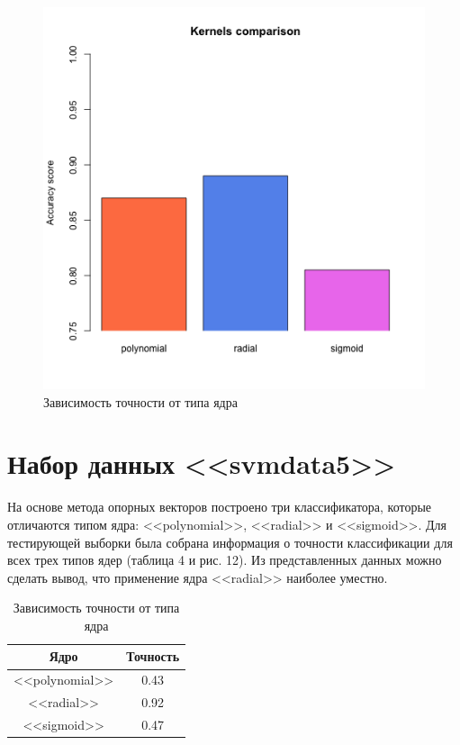 \documentclass[]{article}
\numberwithin{equation}{section}
\begin{document}
        \begin{figure}[H]
            \centering
            \includegraphics[width = 0.8\linewidth]{data/data4_compare_hist.png}
            \caption{Зависимость точности от типа ядра}
        \end{figure}

    \section{Набор данных <<svmdata5>>}
        На основе метода опорных векторов построено три классификатора, которые отличаются типом ядра: <<polynomial>>, <<radial>> и <<sigmoid>>. Для тестирующей выборки была собрана информация о точности классификации для всех трех типов ядер (таблица 4 и рис. 12). Из представленных данных можно сделать вывод, что применение ядра <<radial>> наиболее уместно.

        \begin{table}[H]
            \centering
            \begin{tabular}{|c|c|}
                \hline
                \textbf{Ядро}  & \textbf{Точность} \\
                \hline
                <<polynomial>> & 0.43 \\
                \hline
                <<radial>> & 0.92 \\
                \hline
                <<sigmoid>> & 0.47 \\
                \hline
            \end{tabular}
            \caption{Зависимость точности от типа ядра}
        \end{table}
\end{document}
